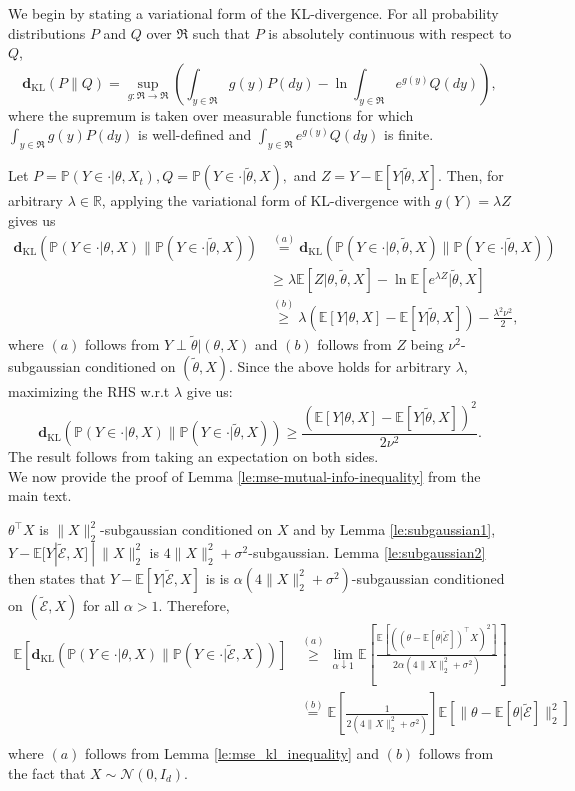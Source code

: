 \documentclass[twoside,11pt]{article}
\renewenvironment{proof}{\par\noindent{\bf Proof\ }}{\hfill\BlackBox\\[2mm]}
\newenvironment{proof}{\par\noindent{\bf Proof\ }}{\hfill\BlackBox\\[2mm]}
\def\environment{\mathcal{E}}
\def\proxy{\tilde{\environment}}
\def\KL{\mathbf{d}_{\mathrm{KL}}}
\def\normal{\mathcal{N}}
\def\proxytheta{\tilde{\theta}}
\def\subgauss{\nu^2}
\def\E{\mathbb{E}}
\def\Pr{\mathbb{P}}
\def\R{\mathbb{R}}
\begin{document}
\begin{proof}
We begin by stating a variational form of the KL-divergence. For all probability distributions $P$ and $Q$ over $\Re$ such that $P$ is absolutely continuous with respect to $Q$, 
$$\KL(P\|Q) = \sup_{g:\Re\rightarrow\Re} \left(\int_{y \in \Re} g(y) P(dy) - \ln \int_{y \in \Re} e^{g(y)} Q(dy)\right),$$
where the supremum is taken over measurable functions for which $\int_{y\in\Re} g(y) P(dy)$ is well-defined  and $\int_{y\in\Re} e^{g(y)} Q(dy)$ is finite.
    
Let $P = \Pr(Y\in\cdot|\theta, X_t), Q = \Pr(Y\in\cdot|\proxytheta, X),$ and $Z = Y - \E[Y|\proxytheta, X]$. Then, for arbitrary $\lambda \in \R$, applying the variational form of KL-divergence with $g(Y) = \lambda Z$ gives us
    \begin{align*}
        \KL(\Pr(Y\in\cdot|\theta, X)\|\Pr(Y\in\cdot|\proxytheta, X))
        & \overset{(a)}{=} \KL(\Pr(Y\in\cdot|\theta,\proxytheta,  X)\|\Pr(Y\in\cdot|\proxytheta, X))\\
        & \geq \lambda \E\left[Z|\theta, \proxytheta, X\right]-\ln\E\left[e^{\lambda Z}|\proxytheta, X \right]\\
        &\overset{(b)}{\geq} \lambda\left(\E[Y|\theta, X] -\E[Y|\proxytheta, X]\right) -\frac{\lambda^2\subgauss}{2},
    \end{align*}
    where $(a)$ follows from $Y\perp \proxytheta |(\theta, X)$ and $(b)$ follows from $Z$ being $\subgauss$-subgaussian conditioned on $(\proxytheta, X)$. Since the above holds for arbitrary $\lambda$, maximizing the RHS w.r.t $\lambda$ give us:
    $$\KL(\Pr(Y\in\cdot|\theta, X)\|\Pr(Y\in\cdot|\proxytheta, X)) \geq \frac{\left(\E[Y|\theta, X] - \E[Y|\proxytheta, X]\right)^2}{2\subgauss}.$$
    The result follows from taking an expectation on both sides.
\end{proof}
We now provide the proof of Lemma \ref{le:mse-mutual-info-inequality} from the main text.
\mseInfoInequality*
\begin{proof}
    $\theta^\top X$ is $\|X\|_2^2$-subgaussian conditioned on $X$ and by Lemma \ref{le:subgaussian1}, $Y - \E[Y|\proxy, X]\ |\ \|X\|_2^2$ is $4\|X\|_2^2+\sigma^2$-subgaussian. Lemma \ref{le:subgaussian2} then states that $Y - \E[Y|\proxy, X]$ is is $\alpha(4\|X\|_2^2+\sigma^2)$-subgaussian conditioned on $(\proxy, X)$ for all $\alpha > 1$. Therefore,
    \begin{align*}
        \E\left[\KL(\Pr(Y\in\cdot|\theta,X)\|\Pr(Y\in\cdot|\proxy, X))\right]
        & \overset{(a)}{\geq} \lim_{\alpha\downarrow 1} \E\left[\frac{\E\left[\left((\theta - \E[\theta|\proxy])^\top X\right)^2\right]}{2\alpha(4\|X\|_2^2 + \sigma^2)}\right]\\
        & \overset{(b)}{=} \E\left[\frac{1}{2(4\|X\|_2^2 + \sigma^2)}\right]\E\left[\|\theta - \E[\theta|\proxy]\|^2_2\right]\\
    \end{align*}
    where $(a)$ follows from Lemma \ref{le:mse_kl_inequality} and $(b)$ follows from the fact that $X\sim \normal(0, I_d)$.
\end{proof}
\end{document}
